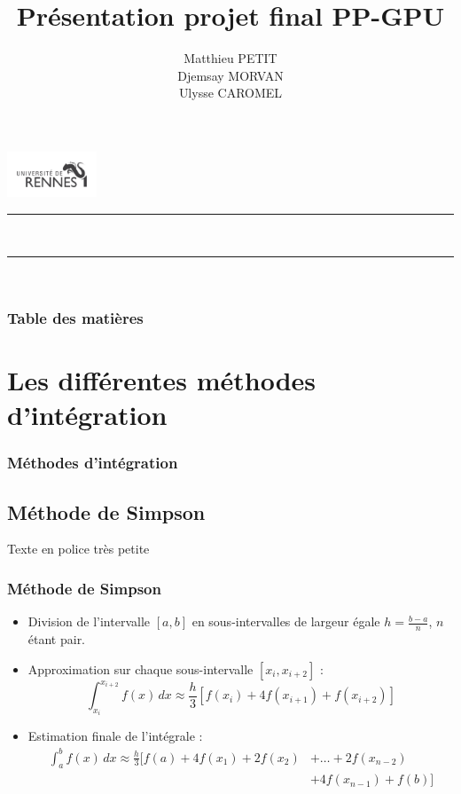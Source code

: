 \documentclass[10pt]{beamer}
\title{Présentation projet final PP-GPU}
\author{Matthieu PETIT \\ Djemsay MORVAN \\ Ulysse CAROMEL}
\begin{document}
\begin{frame}
    \includegraphics[width=0.2\textwidth]{Images/univ-rennes1.png}
    \rule{\linewidth}{0.3mm} \\[0.4cm]
    \titlepage
    \rule{\linewidth}{0.3mm} \\[0.4cm]
\end{frame}

\begin{frame}
    \frametitle[Table des matières]{Table des matières}
    \tableofcontents
\end{frame}

\section{Les différentes méthodes d'intégration}

\begin{frame}
    \frametitle{Méthodes d'intégration}  
    \tableofcontents[currentsection]  
\end{frame}

\subsection{Méthode de Simpson}


\begin{frame}
    {\fontsize{4}{5}\selectfont Texte en police très petite}

    \frametitle{Méthode de Simpson}

    \begin{itemize}
        \item Division de l'intervalle $[a, b]$ en sous-intervalles de largeur égale $h = \frac{b - a}{n}$, $n$ étant pair.
        
        \item Approximation sur chaque sous-intervalle $[x_i, x_{i+2}]$ :
            \[
            \int_{x_i}^{x_{i+2}} f(x) \,dx \approx \frac{h}{3} \left[ f(x_i) + 4f(x_{i+1}) + f(x_{i+2}) \right]
            \]
        
        \item Estimation finale de l'intégrale :
            \begin{align*}
                \int_{a}^{b} f(x) \,dx \approx \frac{h}{3} \Big [ f(a) + 4f(x_1) + 2f(x_2) &+ \ldots + 2f(x_{n-2})  \\
                &+ 4f(x_{n-1}) + f(b) \Big ]
            \end{align*}
    \end{itemize}
    
\end{frame}
\end{document}
